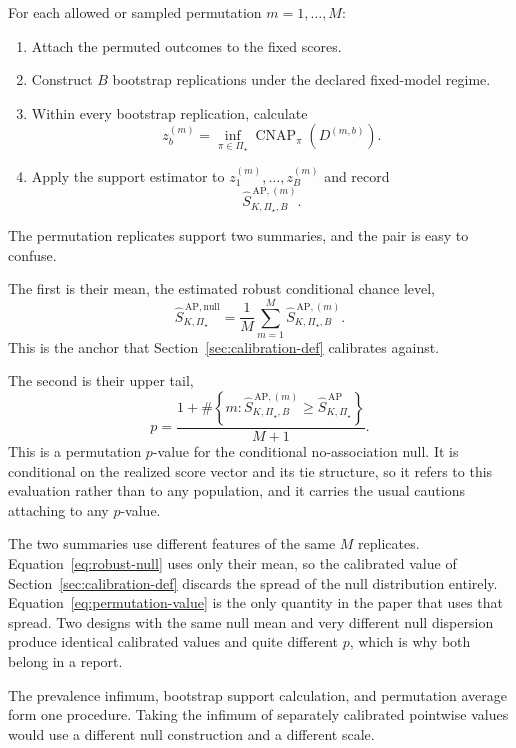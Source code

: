 \documentclass[11pt]{article}
\newcommand{\CNAP}{\operatorname{CNAP}}
\newcommand{\PSet}{\Pi_\star}
\newcommand{\SRobHat}{\widehat S_{K,\PSet}^{\,\mathrm{AP}}}
\newcommand{\SRobNullHat}{\widehat S_{K,\PSet}^{\,\mathrm{AP,null}}}
\theoremstyle{remark}
\begin{document}
For each allowed or sampled permutation $m=1,\ldots,M$:
\begin{enumerate}
\item Attach the permuted outcomes to the fixed scores.
\item Construct $B$ bootstrap replications under the declared fixed-model regime.
\item Within every bootstrap replication, calculate
\[
z_b^{(m)}
=
\inf_{\pi\in\PSet}
\CNAP_\pi(D^{(m,b)}).
\]
\item Apply the support estimator to $z_1^{(m)},\ldots,z_B^{(m)}$ and record
\[
\widehat S_{K,\PSet,B}^{\,\mathrm{AP},(m)}.
\]
\end{enumerate}

The permutation replicates support two summaries, and the pair is easy to confuse.

The first is their mean, the estimated robust conditional chance level,
\begin{equation}
\SRobNullHat
=
\frac{1}{M}
\sum_{m=1}^{M}
\widehat S_{K,\PSet,B}^{\,\mathrm{AP},(m)}.
\label{eq:robust-null}
\end{equation}
This is the anchor that Section~\ref{sec:calibration-def} calibrates against.

The second is their upper tail,
\begin{equation}
p
=
\frac{
1+
\#\left\{
m:
\widehat S_{K,\PSet,B}^{\,\mathrm{AP},(m)}
\geq
\SRobHat
\right\}
}{M+1}.
\label{eq:permutation-value}
\end{equation}
This is a permutation $p$-value for the conditional no-association null. It is conditional on the realized score vector and its tie structure, so it refers to this evaluation rather than to any population, and it carries the usual cautions attaching to any $p$-value.

The two summaries use different features of the same $M$ replicates. Equation~\eqref{eq:robust-null} uses only their mean, so the calibrated value of Section~\ref{sec:calibration-def} discards the spread of the null distribution entirely. Equation~\eqref{eq:permutation-value} is the only quantity in the paper that uses that spread. Two designs with the same null mean and very different null dispersion produce identical calibrated values and quite different $p$, which is why both belong in a report.

The prevalence infimum, bootstrap support calculation, and permutation average form one procedure. Taking the infimum of separately calibrated pointwise values would use a different null construction and a different scale.
\end{document}
